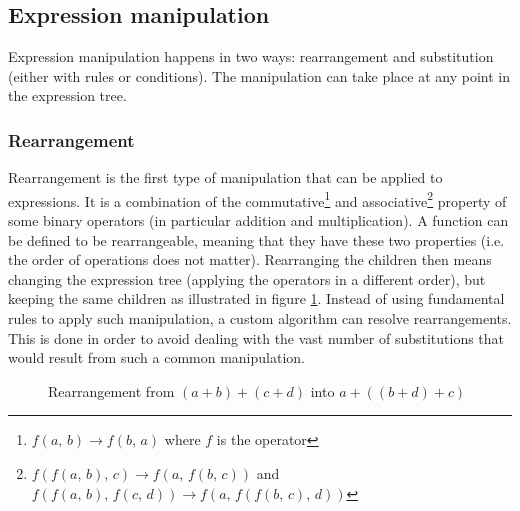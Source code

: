 \documentclass{article}
\begin{document}
\subsection{Expression manipulation}
\label{section:expression-manipulation}
Expression manipulation happens in two ways: rearrangement and substitution (either with rules or conditions). The manipulation can take place at any point in the expression tree.

\subsubsection{Rearrangement}
Rearrangement is the first type of manipulation that can be applied to expressions. It is a combination of the commutative\footnote{$f(a,\,b)\rightarrow f(b,\,a)$ where $f$ is the operator} and associative\footnote{$f(f(a,\,b),\,c)\rightarrow f(a,\,f(b,\,c))$ and $f(f(a,\,b),\,f(c,\,d))\rightarrow f(a,\,f(f(b,\,c),\,d))$} property of some binary operators (in particular addition and multiplication). A function can be defined to be rearrangeable, meaning that they have these two properties (i.e. the order of operations does not matter). Rearranging the children then means changing the expression tree (applying the operators in a different order), but keeping the same children as illustrated in figure \ref{fig:rearrange}. Instead of using fundamental rules to apply such manipulation, a custom algorithm can resolve rearrangements. This is done in order to avoid dealing with the vast number of substitutions that would result from such a common manipulation.

\begin{figure}
\centering
{}
\caption{Rearrangement from $(a+b)+(c+d)$ into $a+((b+d)+c)$} \label{fig:rearrange}
\end{figure}
\end{document}
